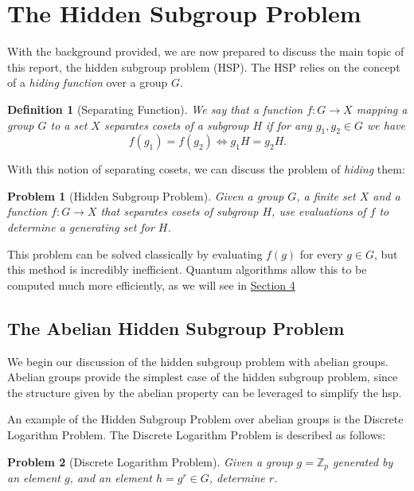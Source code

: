 \documentclass{article}
\theoremstyle{plain}
\theoremstyle{centered}
\newtheorem{definition}{Definition}
\newtheorem{problem}{Problem}
\newcommand{\bb}[1]{\mathbb{#1}}
\begin{document}
\section{The Hidden Subgroup Problem}\label{sec:HSP}
    With the background provided, we are now prepared to discuss the main topic of this report, the hidden subgroup problem (HSP).
    The HSP relies on the concept of a \textit{hiding function} over a group $G$.
    \begin{definition}[Separating Function]\label{def:separating_function}
            We say that a function $f : G \to X$ mapping a group $G$ to a set $X$ \textit{separates cosets} of a subgroup $H$ if for any $g_1, g_2 \in G$ we have $$f(g_1) = f(g_2) \iff g_1 H = g_2 H.$$
        \end{definition}
        With this notion of separating cosets, we can discuss the problem of \textit{hiding} them:
        \begin{problem}[Hidden Subgroup Problem]\label{problem:HSP}
            Given a group $G$, a finite set $X$ and a function $f: G \to X$ that separates cosets of subgroup $H$, use evaluations of $f$ to determine a generating set for $H$.
        \end{problem}
        This problem can be solved classically by evaluating $f(g)$ for every $g \in G$, but this method is incredibly inefficient.
        Quantum algorithms allow this to be computed much more efficiently, as we will see in \hyperref[sec:HSP_algorithms]{Section 4}

    \subsection{The Abelian Hidden Subgroup Problem}\label{HSP:abelian_HSP}
        We begin our discussion of the hidden subgroup problem with abelian groups.
        Abelian groups provide the simplest case of the hidden subgroup problem, since the structure given by the abelian property can be leveraged to simplify the hsp.

        An example of the Hidden Subgroup Problem over abelian groups is the Discrete Logarithm Problem.
        The Discrete Logarithm Problem is described as follows:
        \begin{problem}[Discrete Logarithm Problem]\label{problem:dlp}
            Given a group $g = \bb{Z}_p$ generated by an element $g$, and an element $h = g^r \in G$, determine $r$.
        \end{problem}
\end{document}

